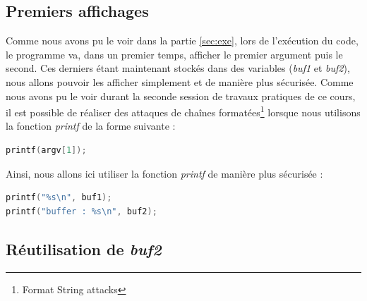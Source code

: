 \subsection{Premiers affichages}

Comme nous avons pu le voir dans la partie \ref{sec:exe}, lors de l'exécution du code, le programme va, dans un premier temps, afficher le premier argument puis le second. Ces derniers étant maintenant stockés dans des variables (\textit{buf1} et \textit{buf2}), nous allons pouvoir les afficher simplement et de manière plus sécurisée. Comme nous avons pu le voir durant la seconde session de travaux pratiques de ce cours, il est possible de réaliser des attaques de chaînes formatées\footnote{Format String attacks} lorsque nous utilisons la fonction \textit{printf} de la forme suivante :
\begin{lstlisting}[language=C]
printf(argv[1]);
\end{lstlisting}
Ainsi, nous allons ici utiliser la fonction \textit{printf} de manière plus sécurisée :
\begin{lstlisting}[language=C]
printf("%s\n", buf1);
printf("buffer : %s\n", buf2);
\end{lstlisting}

\subsection{Réutilisation de \textit{buf2}}\label{buf22}

